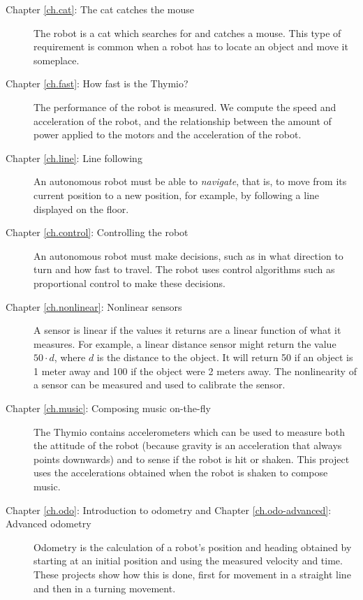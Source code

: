 \begin{description}

\item[Chapter \ref{ch.cat}: The cat catches the mouse] The robot is a
cat which searches for and catches a mouse. This type of requirement is
common when a robot has to locate an object and move it someplace.

\item[Chapter \ref{ch.fast}: How fast is the Thymio?] The
performance of the robot is measured. We compute the speed and
acceleration of the robot, and the relationship between the amount of
power applied to the motors and the acceleration of the robot.

\item[Chapter \ref{ch.line}: Line following] An autonomous robot must be
able to \emph{navigate}, that is, to move from its current position to a
new position, for example, by following a line displayed on the floor.

\item[Chapter \ref{ch.control}: Controlling the robot] An autonomous
robot must make decisions, such as in what direction to turn and how
fast to travel. The robot uses control algorithms such as proportional
control to make these decisions.


\item[Chapter \ref{ch.nonlinear}: Nonlinear sensors] A sensor is linear
if the values it returns are a linear function of what it measures. For
example, a linear distance sensor might return the value $50\cdot d$,
where $d$ is the distance to the object. It will return 50 if an object
is 1 meter away and 100 if the object were 2 meters away. The
nonlinearity of a sensor can be measured and used to calibrate the
sensor.

\item[Chapter \ref{ch.music}: Composing music on-the-fly] The Thymio
contains accelerometers which can be used to measure both the
attitude of the robot (because gravity is an acceleration that always
points downwards) and to sense if the robot is hit or shaken. This
project uses the accelerations obtained when the robot is shaken to
compose music.

\item[Chapter \ref{ch.odo}: Introduction to odometry and Chapter
\ref{ch.odo-advanced}: Advanced odometry] Odometry is the calculation of
a robot's position and heading obtained by starting at an initial
position and using the measured velocity and time. These projects show
how this is done, first for movement in a straight line and then in a
turning movement.


\end{description}
